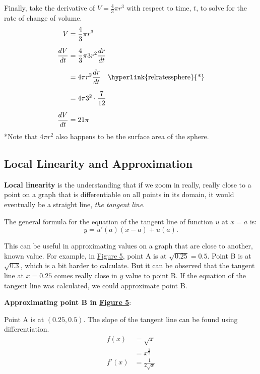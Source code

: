 \documentclass[12pt]{article}
\begin{document}
\begin{enumerate}
                \noindent Finally, take the derivative of $V = \frac{4}{3} \pi r^3$ with respect to time, $t$, to solve for the rate of change of volume.
                \begin{align*}
                    V &= \frac{4}{3} \pi r^3 \\[6pt]
                    \frac{dV}{dt} &= \frac{4}{3} \pi 3r^2 \frac{dr}{dt} \\[6pt]
                    &= 4 \pi r^2 \frac{dr}{dt} \quad \text{\hyperlink{relratessphere}{*}}\\[6pt]
                    &= 4 \pi 3^2 \cdot \frac{7}{12} \\[6pt]
                    \frac{dV}{dt} &= 21 \pi
                \end{align*}
                \hypertarget{relratessphere}{*}Note that $4 \pi r^2$ also happens to be the surface area of the sphere.
            \end{enumerate}

        \subsection{Local Linearity and Approximation}
            \textbf{Local linearity} is the understanding that if we zoom in really, really close to a point on a graph that is differentiable on all points in its domain, it would eventually be a straight line, \textit{the tangent line}.

            \noindent The general formula for the equation of the tangent line of function $u$ at $x=a$ is:
            \[ y=u'(a)(x-a) + u(a). \]

            This can be useful in approximating values on a graph that are close to another, known value. For example, in \hyperref[fig:locallinapprox]{Figure 5}, point A is at $\sqrt{0.25} = 0.5$. Point B is at $\sqrt{0.3}$, which is a bit harder to calculate. But it can be observed that the tangent line at $x=0.25$ comes really close in $y$ value to point B. If the equation of the tangent line was calculated, we could approximate point B.

            \noindent \textbf{Approximating point B in \hyperref[fig:locallinapprox]{Figure 5}}:

            \noindent Point A is at $(0.25, 0.5)$. The slope of the tangent line can be found using differentiation.
            \begin{align*}
                f(x) &= \sqrt{x} \\
                &= x^{\frac{1}{2}} \\
                f'(x) &= \frac{1}{2\sqrt{x}}
            \end{align*}
\end{document}
